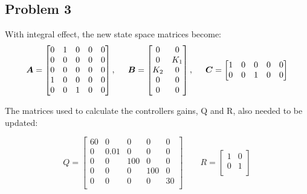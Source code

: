 \subsection{Problem 3}
With integral effect, the new state space matrices become:
\begin{equation}
  \boldsymbol{A} = \begin{bmatrix}
    0 & 1 & 0 & 0 & 0\\
    0 & 0 & 0 & 0 & 0\\
    0 & 0 & 0 & 0 & 0\\
    1 & 0 & 0 & 0 & 0\\
    0 & 0 & 1 & 0 & 0\\
  \end{bmatrix}, \hspace{0.5cm}
  \boldsymbol{B} = \begin{bmatrix}
    0 & 0 \\
    0 & K_1 \\
    K_2 & 0 \\
    0 & 0 \\
    0 & 0 \\
  \end{bmatrix}, \hspace{0.5cm}
  \boldsymbol{C} = \begin{bmatrix}
    1 & 0 & 0 & 0 & 0\\
    0 & 0 & 1 & 0 & 0\\
  \end{bmatrix}
\end{equation}

The matrices used to calculate the controllers gains, Q and R, also needed to be updated:

\begin{equation}
  Q =
  \begin{bmatrix}
    60 & 0   & 0  & 0 & 0 \\
    0  & 0.01 & 0  & 0 & 0 \\
    0  & 0   & 100 & 0 & 0 \\
    0  & 0   & 0  & 100 & 0 \\
    0  & 0   & 0  & 0 & 30 \\
  \end{bmatrix}
  \qquad
  R =
  \begin{bmatrix}
    1 & 0 \\
    0 & 1 \\
  \end{bmatrix}
\end{equation}

